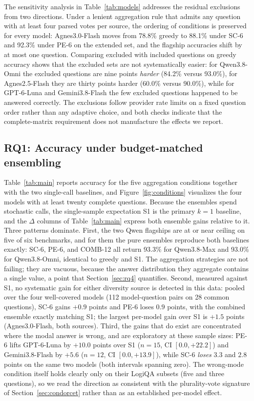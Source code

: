The sensitivity analysis in Table~\ref{tab:models} addresses the residual exclusions from two directions. Under a lenient aggregation rule that admits any question with at least four parsed votes per source, the ordering of conditions is preserved for every model: Agnes3.0-Flash moves from 78.8\% greedy to 88.1\% under SC-6 and 92.3\% under PE-6 on the extended set, and the flagship accuracies shift by at most one question. Comparing excluded with included questions on greedy accuracy shows that the excluded sets are not systematically easier: for Qwen3.8-Omni the excluded questions are nine points \emph{harder} (84.2\% versus 93.0\%), for Agnes2.5-Flash they are thirty points harder (60.0\% versus 90.0\%), while for GPT-6-Luna and Gemini3.8-Flash the few excluded questions happened to be answered correctly. The exclusions follow provider rate limits on a fixed question order rather than any adaptive choice, and both checks indicate that the complete-matrix requirement does not manufacture the effects we report.

\subsection{RQ1: Accuracy under budget-matched ensembling}
\label{sec:rq1}

Table~\ref{tab:main} reports accuracy for the five aggregation conditions together with the two single-call baselines, and Figure~\ref{fig:conditions} visualizes the four models with at least twenty complete questions. Because the ensembles spend stochastic calls, the single-sample expectation S1 is the primary $k{=}1$ baseline, and the $\Delta$ columns of Table~\ref{tab:main} express both ensemble gains relative to it. Three patterns dominate. First, the two Qwen flagships are at or near ceiling on five of six benchmarks, and for them the pure ensembles reproduce both baselines exactly: SC-6, PE-6, and COMB-12 all return 93.3\% for Qwen3.8-Max and 93.0\% for Qwen3.8-Omni, identical to greedy and S1. The aggregation strategies are not failing; they are vacuous, because the answer distribution they aggregate contains a single value, a point that Section~\ref{sec:rq4} quantifies. Second, measured against S1, no systematic gain for either diversity source is detected in this data: pooled over the four well-covered models (112 model-question pairs on 28 common questions), SC-6 gains $+0.9$ points and PE-6 loses $0.9$ points, with the combined ensemble exactly matching S1; the largest per-model gain over S1 is $+1.5$ points (Agnes3.0-Flash, both sources). Third, the gains that do exist are concentrated where the modal answer is wrong, and are exploratory at these sample sizes: PE-6 lifts GPT-6-Luna by $+10.0$ points over S1 ($n=15$, CI $[0.0, +22.2]$) and Gemini3.8-Flash by $+5.6$ ($n=12$, CI $[0.0, +13.9]$), while SC-6 \emph{loses} $3.3$ and $2.8$ points on the same two models (both intervals spanning zero). The wrong-mode condition itself holds clearly only on their LogiQA subsets (five and three questions), so we read the direction as consistent with the plurality-vote signature of Section~\ref{sec:condorcet} rather than as an established per-model effect.

